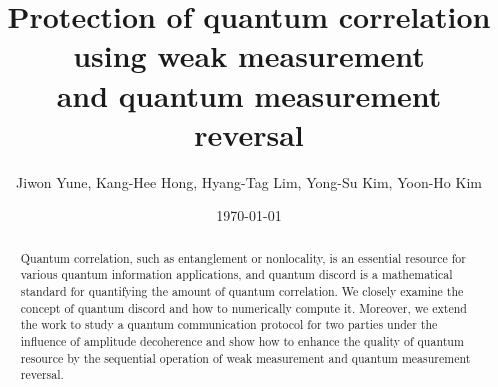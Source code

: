 \documentclass[%
 reprint,
 amsmath,amssymb,
 aps,
]{revtex4-1}
\begin{document}

\title{Protection of quantum correlation using weak measurement \\ and quantum measurement reversal}%

\author{Jiwon Yune, Kang-Hee Hong, Hyang-Tag Lim, Yong-Su Kim, Yoon-Ho Kim}




\date{\today}%

\begin{abstract}
Quantum correlation, such as entanglement or nonlocality, is an essential resource for various quantum information applications, and quantum discord is a mathematical standard for quantifying the amount of quantum correlation. We closely examine the concept of quantum discord and how to numerically compute it. Moreover, we extend the work to study a quantum communication protocol for two parties under the influence of amplitude decoherence and show how to enhance the quality of quantum resource by the sequential operation of weak measurement and quantum measurement reversal.
\end{abstract}
\end{document}
